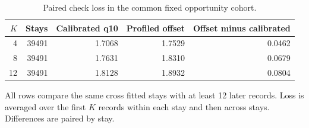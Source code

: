 \begin{table}[!htbp]
\caption{Paired check loss in the common fixed opportunity cohort.}
\label{tab:common_cohort_fixed_opportunity_check_loss}
\centering
\small
\begin{tabular}{rrrrr}
\hline
$K$ & Stays & Calibrated q10 & Profiled offset & Offset minus calibrated\\
\hline
4 & 39491 & 1.7068 & 1.7529 & 0.0462\\
8 & 39491 & 1.7631 & 1.8310 & 0.0679\\
12 & 39491 & 1.8128 & 1.8932 & 0.0804\\
\hline
\end{tabular}
\par\smallskip
\footnotesize{All rows compare the same cross fitted stays with at least 12 later records. Loss is averaged over the first $K$ records within each stay and then across stays. Differences are paired by stay.}
\end{table}
